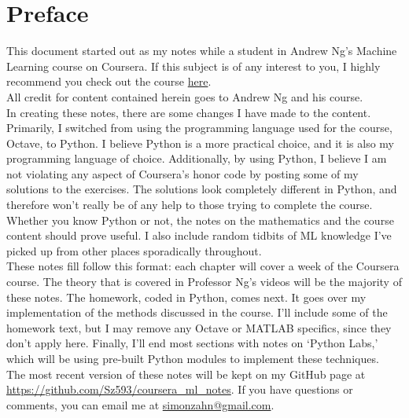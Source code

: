\chapter*{Preface}

This document started out as my notes while a student in Andrew Ng's Machine Learning course on Coursera. If this subject is of any interest to you, I highly recommend you check out the course \href{https://www.coursera.org/learn/machine-learning}{here}. \\


All credit for content contained herein goes to Andrew Ng and his course. \\

In creating these notes, there are some changes I have made to the content. Primarily, I switched from using the programming language used for the course, Octave, to Python. I believe Python is a more practical choice, and it is also my programming language of choice. Additionally, by using Python, I believe I am not violating any aspect of Coursera's honor code by posting some of my solutions to the exercises. The solutions look completely different in Python, and therefore won't really be of any help to those trying to complete the course. Whether you know Python or not, the notes on the mathematics and the course content should prove useful. I also include random tidbits of ML knowledge I've picked up from other places sporadically throughout. \\

These notes fill follow this format: each chapter will cover a week of the Coursera course. The theory that is covered in Professor Ng's videos will be the majority of these notes. The homework, coded in Python, comes next. It goes over my implementation of the methods discussed in the course. I'll include some of the homework text, but I may remove any Octave or MATLAB specifics, since they don't apply here. Finally, I'll end most sections with notes on `Python Labs,' which will be using pre-built Python modules to implement these techniques. \\

The most recent version of these notes will be kept on my GitHub page at \url{https://github.com/Sz593/coursera_ml_notes}. If you have questions or comments, you can email me at \href{mailto:simonzahn@gmail.com}{simonzahn@gmail.com}.